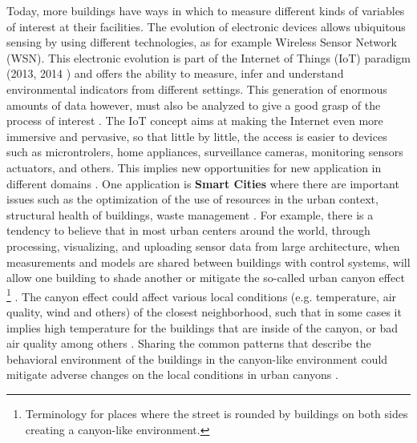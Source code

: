 Today, more buildings have ways in which to measure different kinds of variables of interest at their facilities. The evolution of electronic devices allows ubiquitous sensing by using different technologies, as for example Wireless Sensor Network (WSN). This electronic evolution is part of the Internet of Things (IoT) paradigm (2013, 2014 \citep{gubbi2013internet,zanella2014internet}) and offers the ability to measure, infer and understand environmental indicators from different settings. This generation of enormous amounts of data however, must also be analyzed to give a good grasp of the process of interest \cite{gubbi2013internet}.  The IoT concept aims at making the Internet even more immersive and pervasive, so that little by little, the access is easier to devices such as microntrolers, home appliances, surveillance cameras, monitoring sensors actuators, and others. This implies new opportunities for new application in different domains \cite{zanella2014internet}. One application is \textbf{Smart Cities} where there are important issues such as the optimization of the use of resources in the urban context, structural health of buildings, waste management \cite{zanella2014internet}. For example, there is a tendency to believe that in most urban centers around the world, through processing, visualizing, and uploading sensor data from large architecture, when measurements and models are shared between buildings with control systems, will allow one building to shade another or mitigate the so-called urban canyon effect \footnote{Terminology for places where the street is rounded by buildings on both sides creating a canyon-like environment.} \cite{cuff2008urban}. The canyon effect could affect various local conditions (e.g. temperature, air quality, wind and others) of the closest neighborhood, such that in some cases it implies high temperature for the buildings that are inside of the canyon, or bad air quality among others \citep{cuff2008urban,andreou2013thermal}. Sharing the common patterns that describe the behavioral environment of the buildings in the canyon-like environment could mitigate adverse changes on the local conditions in urban canyons \cite{cuff2008urban}. 
   

